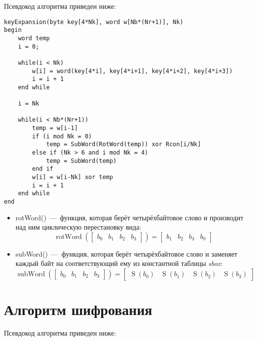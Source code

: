 \documentclass[utf8x, 14pt, bold, times]{G7-32} %
\begin{document}
Псевдокод алгоритма приведен ниже:\\

\begin{lstlisting}[style=pseudocode]
keyExpansion(byte key[4*Nk], word w[Nb*(Nr+1)], Nk)
begin
    word temp
    i = 0;
    
    while(i < Nk)
        w[i] = word(key[4*i], key[4*i+1], key[4*i+2], key[4*i+3])
        i = i + 1
    end while
    
    i = Nk

    while(i < Nb*(Nr+1))
        temp = w[i-1]
        if (i mod Nk = 0)
            temp = SubWord(RotWord(temp)) xor Rcon[i/Nk]
        else if (Nk > 6 and i mod Nk = 4)
            temp = SubWord(temp)
        end if
        w[i] = w[i-Nk] xor temp
        i = i + 1
    end while
end
\end{lstlisting}

\begin{itemize}
\item rotWord()~---~функция, которая берёт четырёхбайтовое слово и производит
      над ним циклическую перестановку вида:
      $$
      \operatorname{rotWord}(
      \begin{bmatrix} 
        b_{0} & b_{1} & b_{2} & b_{3}
      \end{bmatrix}
      ) 
        =
      \begin{bmatrix}
        b_{1} & b_{2} & b_{3} & b_{0}
      \end{bmatrix}
      $$
\item subWord()~---~функция, которая берёт четырёхбайтовое слово и заменяет
      каждый байт на соответствующий ему из константной таблицы \textsl{sbox}:
      $$
      \operatorname{subWord}(
      \begin{bmatrix}
        b_{0} & b_{1} & b_{2} &b_{3}
      \end{bmatrix}
      )
        =
      \begin{bmatrix}
        \operatorname{S}(b_{0}) & \operatorname{S}(b_{1}) & \operatorname{S}(b_{2}) & \operatorname{S}(b_{3})
      \end{bmatrix}
      $$
\end{itemize}

\section{Алгоритм шифрования}

Псевдокод алгоритма приведен ниже:\\
\end{document}
